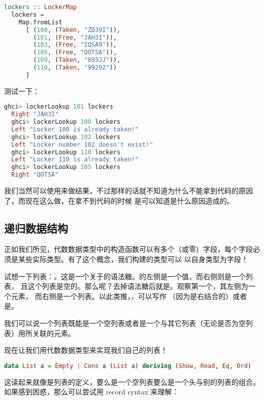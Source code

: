 \documentclass[./main.tex]{subfiles}
\begin{document}
\begin{lstlisting}[language=Haskell]
  lockers :: LockerMap
  lockers =
    Map.fromList
      [ (100, (Taken, "ZD39I")),
        (101, (Free, "JAH3I")),
        (103, (Free, "IQSA9")),
        (105, (Free, "QOTSA")),
        (109, (Taken, "893JJ")),
        (110, (Taken, "99292"))
      ]
\end{lstlisting}

测试一下：

\begin{lstlisting}[language=Haskell]
  ghci> lockerLookup 101 lockers
  Right "JAH3I"
  ghci> lockerLookup 100 lockers
  Left "Locker 100 is already taken!"
  ghci> lockerLookup 102 lockers
  Left "Locker number 102 doesn't exist!"
  ghci> lockerLookup 110 lockers
  Left "Locker 110 is already taken!"
  ghci> lockerLookup 105 lockers
  Right "QOTSA"
\end{lstlisting}

我们当然可以使用来做结果，不过那样的话就不知道为什么不能拿到代码的原因了，而现在这么做，在拿不到代码的时候
是可以知道是什么原因造成的。

\subsection*{递归数据结构}

正如我们所见，代数数据类型中的构造函数可以有多个（或零）字段，每个字段必须是某些实际类型。有了这个概念，我们构建的类型可以
以自身类型为字段！

试想一下列表：\acode{[5]}。这是一个关于的语法糖。\acode{:}的左侧是一个值，而右侧则是一个列表，
且这个列表是空的。那么\acode{[4,5]}呢？去掉语法糖后就是。观察第一个\acode{:}，其左侧为一个元素，
而右侧是一个列表。以此类推，，可以写作
（因为\acode{:}是右结合的）或者是\acode{[3,5,6,7]}。

我们可以说一个列表既能是一个空列表或者是一个与其它列表（无论是否为空列表）用\acode{:}所关联的元素。

现在让我们用代数数据类型来实现我们自己的列表！

\begin{lstlisting}[language=Haskell]
  data List a = Empty | Cons a (List a) deriving (Show, Read, Eq, Ord)
\end{lstlisting}

这读起来就像是列表的定义，要么是一个空列表要么是一个头与别的列表的组合。如果感到困惑，那么可以尝试用 record syntax 来理解：
\end{document}
